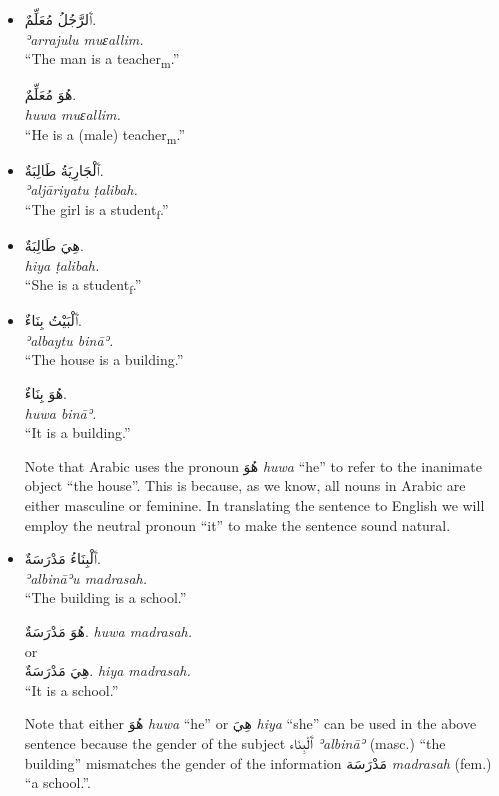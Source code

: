 \documentclass[
  10pt,
]{book}
\begin{document}
\begin{itemize}
\item
  \foreignlanguage{arabic}{ٱَلرَّجُلُ مُعَلِّمٌ.}\\
  \emph{ʾarrajulu muɛallim.}\\
  \enquote{The man is a teacher\textsubscript{m}.}

  \foreignlanguage{arabic}{هُوَ مُعَلِّمٌ.}\\
  \emph{huwa muɛallim.}\\
  \enquote{He is a (male) teacher\textsubscript{m}.}
\item
  \foreignlanguage{arabic}{ٱَلْجَارِيَةُ طَالِبَةٌ.}\\
  \emph{ʾaljāriyatu ṭalibah.}\\
  \enquote{The girl is a student\textsubscript{f}.}
\item
  \foreignlanguage{arabic}{هِيَ طَالِبَةٌ.}\\
  \emph{hiya ṭalibah.}\\
  \enquote{She is a student\textsubscript{f}.}
\item
  \foreignlanguage{arabic}{ٱَلْبَيْتُ بِنَاءٌ.}\\
  \emph{ʾalbaytu bināʾ.}\\
  \enquote{The house is a building.}

  \foreignlanguage{arabic}{هُوَ بِنَاءٌ.}\\
  \emph{huwa bināʾ.}\\
  \enquote{It is a building.}

  Note that Arabic uses the pronoun \foreignlanguage{arabic}{هُوَ} \emph{huwa} \enquote{he} to refer to the inanimate object \enquote{the house}. This is because, as we know, all nouns in Arabic are either masculine or feminine. In translating the sentence to English we will employ the neutral pronoun \enquote{it} to make the sentence sound natural.
\item
  \foreignlanguage{arabic}{ٱَلْبِنَاءُ مَدْرَسَةٌ.}\\
  \emph{ʾalbināʾu madrasah.}\\
  \enquote{The building is a school.}

  \foreignlanguage{arabic}{هُوَ مَدْرَسَةٌ.}
  \emph{huwa madrasah.}\\
  or\\
  \foreignlanguage{arabic}{هِيَ مَدْرَسَةٌ.}
  \emph{hiya madrasah.}\\
  \enquote{It is a school.}

  Note that either \foreignlanguage{arabic}{هُوَ} \emph{huwa} \enquote{he} or \foreignlanguage{arabic}{هِيَ} \emph{hiya} \enquote{she} can be used in the above sentence because the gender of the subject \foreignlanguage{arabic}{ٱَلْبِنَاء} \emph{ʾalbināʾ} (masc.) \enquote{the building} mismatches the gender of the information \foreignlanguage{arabic}{مَدْرَسَة} \emph{madrasah} (fem.) \enquote{a school.}.


\end{itemize}
\end{document}
